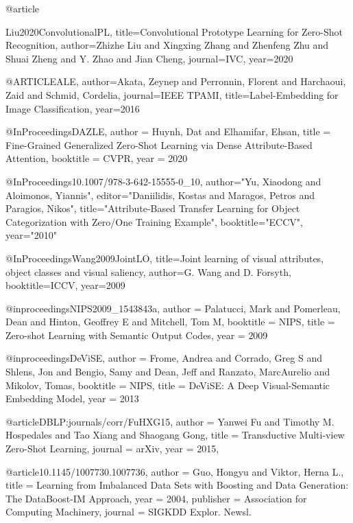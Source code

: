 @article{Liu2020ConvolutionalPL,
  title={Convolutional Prototype Learning for Zero-Shot Recognition},
  author={Zhizhe Liu and Xingxing Zhang and Zhenfeng Zhu and Shuai Zheng and Y. Zhao and Jian Cheng},
  journal={IVC},
  year={2020}
  
}


@ARTICLE{ALE,  author={Akata, Zeynep and Perronnin, Florent and Harchaoui, Zaid and Schmid, Cordelia},  journal={IEEE TPAMI},   title={Label-Embedding for Image Classification},   year={2016}}

@InProceedings{DAZLE,
author = {Huynh, Dat and Elhamifar, Ehsan},
title = {Fine-Grained Generalized Zero-Shot Learning via Dense Attribute-Based Attention},
booktitle = {CVPR},
year = {2020}
}


@InProceedings{10.1007/978-3-642-15555-0_10,
author="Yu, Xiaodong
and Aloimonos, Yiannis",
editor="Daniilidis, Kostas
and Maragos, Petros
and Paragios, Nikos",
title="Attribute-Based Transfer Learning for Object Categorization with Zero/One Training Example",
booktitle="ECCV",
year="2010"}



@InProceedings{Wang2009JointLO,
  title={Joint learning of visual attributes, object classes and visual saliency},
  author={G. Wang and D. Forsyth},
  booktitle={ICCV},
  year={2009}
}


@inproceedings{NIPS2009_1543843a,
 author = {Palatucci, Mark and Pomerleau, Dean and Hinton, Geoffrey E and Mitchell, Tom M},
 booktitle = {NIPS},
 title = {Zero-shot Learning with Semantic Output Codes},
 year = {2009}
}




@inproceedings{DeViSE,
 author = {Frome, Andrea and Corrado, Greg S and Shlens, Jon and Bengio, Samy and Dean, Jeff and Ranzato, Marc\textquotesingle Aurelio and Mikolov, Tomas},
 booktitle = {NIPS},
 title = {DeViSE: A Deep Visual-Semantic Embedding Model},
 year = {2013}
}




@article{DBLP:journals/corr/FuHXG15,
  author    = {Yanwei Fu and
               Timothy M. Hospedales and
               Tao Xiang and
               Shaogang Gong},
  title     = {Transductive Multi-view Zero-Shot Learning},
  journal   = {arXiv},
  year      = {2015},
  }




@article{10.1145/1007730.1007736,
author = {Guo, Hongyu and Viktor, Herna L.},
title = {Learning from Imbalanced Data Sets with Boosting and Data Generation: The DataBoost-IM Approach},
year = {2004},
publisher = {Association for Computing Machinery},
journal = {SIGKDD Explor. Newsl.}
}


